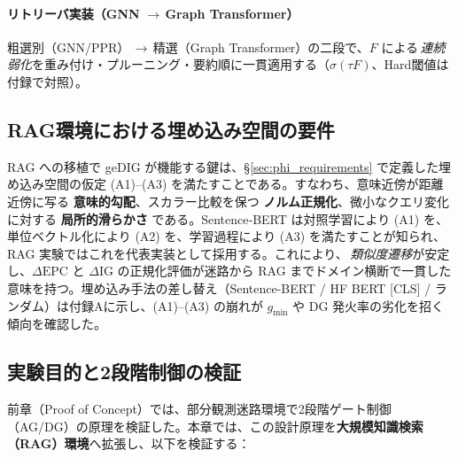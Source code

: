 \documentclass[ja=standard,xelatex]{bxjsarticle}
\begin{document}
\paragraph{リトリーバ実装（GNN\,\,$\to$\,Graph Transformer）}
粗選別（GNN/PPR）\,$\to$\,精選（Graph Transformer）の二段で、$F$ による\,\emph{連続弱化}を重み付け・プルーニング・要約順に一貫適用する（$\sigma(\tau F)$、Hard閾値は付録で対照）。

\subsection{RAG環境における埋め込み空間の要件}
\label{sec:rag_embed_requirements}
RAG への移植で geDIG が機能する鍵は、\S\ref{sec:phi_requirements} で定義した埋め込み空間の仮定 (A1)--(A3) を満たすことである。すなわち、意味近傍が距離近傍に写る \textbf{意味的勾配}、スカラー比較を保つ \textbf{ノルム正規化}、微小なクエリ変化に対する \textbf{局所的滑らかさ} である。Sentence‑BERT は対照学習により (A1) を、単位ベクトル化により (A2) を、学習過程により (A3) を満たすことが知られ\cite{Reimers2019}、RAG 実験ではこれを代表実装として採用する。これにより、\,\emph{類似度遷移}が安定し、$\Delta\mathrm{EPC}$ と $\Delta\mathrm{IG}$ の正規化評価が迷路から RAG までドメイン横断で一貫した意味を持つ。埋め込み手法の差し替え（Sentence-BERT / HF BERT [CLS] / ランダム）は付録Aに示し、(A1)–(A3) の崩れが $g_{\min}$ や DG 発火率の劣化を招く傾向を確認した。

\subsection{実験目的と2段階制御の検証}

前章（Proof of Concept）では、部分観測迷路環境で2段階ゲート制御（AG/DG）の原理を検証した。本章では、この設計原理を\textbf{大規模知識検索（RAG）環境}へ拡張し、以下を検証する：
\end{document}
